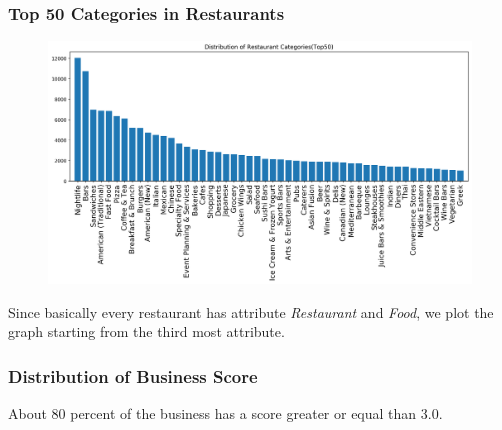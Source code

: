 \documentclass[12pt]{article}
\begin{document}
\subsubsection{Top 50 Categories in Restaurants}
\begin{figure}[H]
\begin{center}
    \includegraphics[width=1.0\textwidth]{../05_dataMining/distributionRestaurants.png}
\end{center}
\end{figure}
Since basically every restaurant has attribute {\it Restaurant} and {\it Food}, we plot the graph starting from the third most attribute.

\subsubsection{Distribution of Business Score}
\begin{figure}[H]
\captionsetup[subfigure]{labelformat=empty}
\centering
{}
\end{figure}
About 80 percent of the business has a score greater or equal than 3.0.
\end{document}

